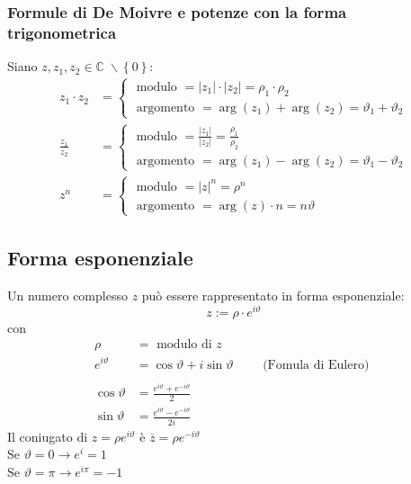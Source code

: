 \documentclass[a4paper]{article}
\begin{document}
\subsubsection*{Formule di De Moivre e potenze con la forma trigonometrica}
Siano \(z, z_1, z_2 \in \mathbb{C} \; \backslash \left\{ 0 \right\}\):
\begin{align*}
	z_1 \cdot z_2 &= 
	\begin{cases}
		\text{ modulo } = \left| z_1 \right| \cdot \left| z_2 \right| = \rho_1 \cdot \rho_2 \\
		\text{ argomento } = \arg(z_1) + \arg(z_2) = \vartheta_1 + \vartheta_2
	\end{cases} \\
	\frac{z_1}{z_2} &= 
	\begin{cases}
		\text{ modulo } = \frac{\left| z_1 \right|}{\left| z_2 \right|} = \frac{\rho_1}{\rho_2}\\
		\text{ argomento } = \arg(z_1) - \arg(z_2) = \vartheta_1 - \vartheta_2
	\end{cases} \\
	z ^ n &= 
	\begin{cases}
		\text{ modulo } = \left| z \right| ^ n = \rho ^ n \\
		\text{ argomento } = \arg(z) \cdot n = n \vartheta
	\end{cases}
\end{align*}


\subsection{Forma esponenziale}
Un numero complesso \(z\) può essere rappresentato in forma esponenziale:
\[z := \rho \cdot e ^ {i \vartheta}\]
con
\begin{align*}
	\rho &= \text{ modulo di } z \\
	e^{i\vartheta} &= \cos \vartheta + i \sin \vartheta \qquad \text{ (Fomula di Eulero) } \\
	\\
	\cos \vartheta &= \frac{e ^ {i \vartheta} + e ^ {-i \vartheta}}{2} \\
	\sin \vartheta &= \frac{e ^ {i \vartheta} - e ^ {-i \vartheta}}{2i}
\end{align*}
Il coniugato di  \(z = \rho e ^ {i \vartheta}\) è \(\overline{z} = \rho e ^ {-i \vartheta}\) \\
Se \(\vartheta = 0 \to e ^ i = 1\) \\
Se \(\vartheta = \pi \to e ^ {i\pi} = -1\)
\end{document}
